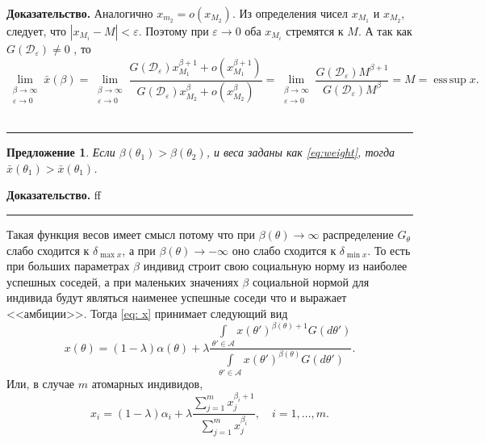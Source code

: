 \documentclass[12pt]{article}
\newtheorem{proposition}{Предложение}
\newenvironment{proof}[1][Доказательство]{\noindent\textbf{#1.} }{\ \rule{0.5em}{0.5em}}
\newcommand\abs[1]{\left\lvert#1\right\rvert}
\DeclareMathOperator*{\esssup}{ess\,sup}
\begin{document}
\begin{proof}
Аналогично $x_{m_2} = o(x_{M_2}). $ 
Из определения чисел $x_{M_1}$ и $x_{M_2}$,  следует,  что $\abs{x_{M_i} - M} < \varepsilon$.  Поэтому при $\varepsilon \to 0$ оба $x_{M_i}$ стремятся к $M$. 
А так как $G(\mathcal{D}_\varepsilon) \neq 0$ ,  то
\begin{equation*}
\lim\limits_{\substack{\beta \to \infty \\  \varepsilon \to 0}} \bar{x}(\beta) = 
\lim\limits_{\substack{\beta \to \infty \\  \varepsilon \to 0}} \frac{G(\mathcal{D}_\varepsilon) x_{M_1}^{\beta + 1} + o(x_{M_1}^{\beta+1})}{G(\mathcal{D}_\varepsilon) x_{M_2}^{\beta} + o(x_{M_2}^{\beta})} =
\lim\limits_{\substack{\beta \to \infty \\  \varepsilon \to 0}}  \frac{G(\mathcal{D}_\varepsilon)M^{\beta+1}}{G(\mathcal{D}_\varepsilon)M^{\beta}} = M = \esssup x.
\end{equation*}
\end{proof}

\begin{proposition}
Если $\beta(\theta_1) > \beta(\theta_2)$, и веса заданы как \eqref{eq:weight}, тогда $\bar{x}(\theta_1) > \bar{x}(\theta_1)$.
\end{proposition}
\begin{proof}
ff
\end{proof}

Такая функция весов имеет смысл потому что при $\beta(\theta) \rightarrow \infty$ распределение $G_\theta$ слабо сходится к $\delta_{\max x}$,  а при $\beta(\theta) \rightarrow -\infty$ оно слабо сходится к $\delta_{\min x}$.  
То есть при больших параметрах $\beta$ индивид строит свою социальную норму из наиболее успешных соседей,  а при маленьких значениях $\beta$ социальной нормой для индивида будут являться наименее успешные соседи что и выражает <<амбиции>>.
Тогда \eqref{eq: x} принимает следующий вид
$$
x(\theta) = (1-\lambda)\alpha(\theta) + \lambda \frac{\int\limits_{\theta' \in \mathcal{A}} x(\theta')^{\beta(\theta) + 1} G(d \theta')}{\int\limits_{\theta' \in \mathcal{A}} x(\theta')^{\beta(\theta)}G(d \theta')}.
$$
Или,  в случае $m$ атомарных индивидов,
$$
x_i = (1-\lambda) \alpha_i + \lambda \frac{\sum\limits_{j=1}^m x_j^{\beta_i+1}}{\sum\limits_{j=1}^m x_j^{\beta_i}}, \quad i = 1,\dots , m.
$$
\end{document}
